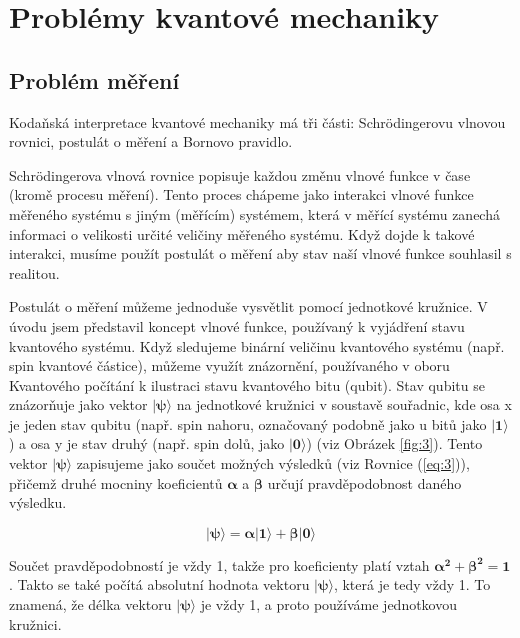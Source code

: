 \section{Problémy kvantové mechaniky}
    \subsection{Problém měření}
Kodaňská interpretace kvantové mechaniky má tři části: Schrödingerovu vlnovou rovnici, postulát o měření a Bornovo pravidlo.

Schrödingerova vlnová rovnice popisuje každou změnu vlnové funkce v čase (kromě procesu měření). Tento proces chápeme jako interakci vlnové funkce měřeného systé\-mu s jiným (měřícím) systémem, která v měřící systému zanechá informaci o velikosti určité veličiny měřeného systému. Když dojde k takové interakci, musíme použít postulát o měření aby stav naší vlnové funkce souhlasil s realitou.

Postulát o měření můžeme jednoduše vysvětlit pomocí jednotkové kružnice. V úvodu jsem představil koncept vlnové funkce, používaný k vyjádření stavu kvantového systému. Když sledujeme binární veličinu kvantového systému (např. spin kvantové částice), můžeme využít znázorně\-ní, používaného v oboru Kvantového počítání k ilustraci stavu kvantového bitu (qubit). Stav qubitu se znázorňuje jako vektor $\bm{|\psi\rangle}$ na jednotkové kružnici v soustavě souřadnic, kde osa x je jeden stav qubitu (např. spin nahoru, označovaný podobně jako u bitů jako $\bm{|1\rangle}$) a osa y je stav druhý (např. spin dolů, jako $\bm{|0\rangle}$) (viz Obrázek \ref{fig:3}). Tento vektor $\bm{|\psi\rangle}$ zapisujeme jako součet možných výsledků (viz Rovnice (\ref{eq:3})), přičemž druhé mocniny koeficientů $\bm{\alpha}$ a $\bm{\beta}$ určují pravděpodobnost daného výsledku. 

\begin{equation}
    \bm{|\psi\rangle = \alpha|1\rangle + \beta|0\rangle}
    \label{eq:3}
\end{equation}

Součet pravděpodobností je vždy 1, takže pro koeficienty platí vztah $\bm{\alpha^2 + \beta^2 = 1}$. Takto se také počítá absolutní hodnota vektoru $\bm{|\psi\rangle}$, která je tedy vždy 1. To znamená, že délka vektoru $\bm{|\psi\rangle}$ je vždy 1, a proto používáme jednotkovou kružnici. 

